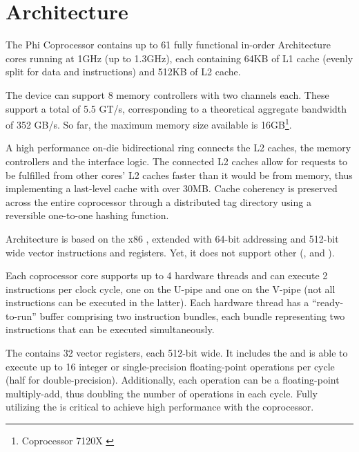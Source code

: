 \documentclass[../thesis]{subfiles}
\begin{document}
	\section{Architecture}
	\label{sec:mic:arch}

	The \intel\xeon Phi Coprocessor contains up to 61 fully functional in-order \intel\mic Architecture cores running at 1GHz (up to 1.3GHz), each containing 64KB of L1 cache (evenly split for data and instructions) and 512KB of L2 cache.

	The device can support 8 memory controllers with two  channels each. These support a total of 5.5 GT/s, corresponding to a theoretical aggregate bandwidth of 352 GB/s. So far, the maximum memory size available is 16GB\footnote{\intel\xeonphi Coprocessor 7120X \cite{intel:datasheet:xeonphi}}.

	A high performance on-die bidirectional ring connects the L2 caches, the memory controllers and the \pcie interface logic. The connected L2 caches allow for requests to be fulfilled from other cores' L2 caches faster than it would be from memory, thus implementing a last-level cache with over 30MB. Cache coherency is preserved across the entire coprocessor through a distributed tag directory using a reversible one-to-one hashing function.

	\intel\mic Architecture is based on the x86 \isa, extended with 64-bit addressing and 512-bit wide \simd vector instructions and registers. Yet, it does not support other \simd\isas (\mmx, \intel\sse and \intel\avx).

	Each coprocessor core supports up to 4 hardware threads and can execute 2 instructions per clock cycle, one on the U-pipe and one on the V-pipe (not all instructions can be executed in the latter). Each hardware thread has a ``ready-to-run'' buffer comprising two instruction bundles, each bundle representing two instructions that can be executed simultaneously.

	The \vpu contains 32 vector registers, each 512-bit wide. It includes the \emu and is able to execute up to 16 integer or single-precision floating-point operations per cycle (half for double-precision). Additionally, each operation can be a floating-point multiply-add, thus doubling the number of operations in each cycle. Fully utilizing the \vpu is critical to achieve high performance with the coprocessor.
\end{document}
